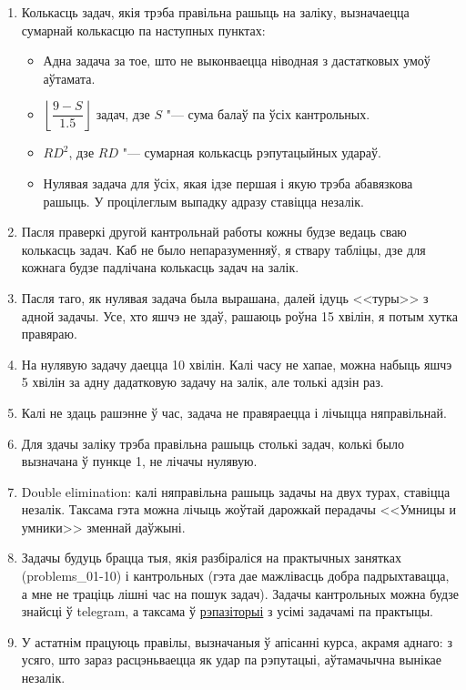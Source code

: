 \documentclass[12pt, a4paper]{extarticle}
\begin{document}
    \begin{enumerate}
        \item Колькасць задач, якія трэба правільна рашыць на заліку, вызначаецца сумарнай колькасцю па наступных пунктах:
        \begin{itemize}
            \item Адна задача за тое, што не выконваецца ніводная з дастатковых умоў аўтамата.
            \item $\left\lfloor \dfrac{9 - S}{1.5} \right\rfloor$ задач, дзе $S$ "--- сума балаў па ўсіх кантрольных.
            \item $RD^2$, дзе $RD$ "--- сумарная колькасць рэпутацыйных удараў.
            \item Нулявая задача для ўсіх, якая ідзе першая і якую трэба абавязкова рашыць. У процілеглым выпадку адразу ставіцца незалік.
        \end{itemize}
        \item Пасля праверкі другой кантрольнай работы кожны будзе ведаць сваю колькасць задач. Каб не было непаразуменняў, я ствару табліцы, дзе для кожнага будзе падлічана колькасць задач на залік.
        \item Пасля таго, як нулявая задача была вырашана, далей ідуць <<туры>> з адной задачы. Усе, хто яшчэ не здаў, рашаюць роўна 15 хвілін, я потым хутка правяраю. 
        \item На нулявую задачу даецца 10 хвілін. Калі часу не хапае, можна набыць яшчэ 5 хвілін за адну дадатковую задачу на залік, але толькі адзін раз.
        \item Калі не здаць рашэнне ў час, задача не правяраецца і лічыцца няправільнай. 
        \item Для здачы заліку трэба правільна рашыць столькі задач, колькі было вызначана ў пункце 1, не лічачы нулявую.
        \item Double elimination: калі няправільна рашыць задачы на двух турах, ставіцца незалік. Таксама гэта можна лічыць жоўтай дарожкай перадачы <<Умницы и умники>> зменнай даўжыні.
        \item Задачы будуць брацца тыя, якія разбіраліся на практычных занятках (problems\_01-10) і кантрольных (гэта дае мажлівасць добра падрыхтавацца, а мне не траціць лішні час на пошук задач). Задачы кантрольных можна будзе знайсці ў telegram, а таксама ў \href{https://github.com/bsu-docs/discrete-mathematics-problems}{рэпазіторыі} з усімі задачамі па практыцы.
        \item У астатнім працуюць правілы, вызначаныя ў апісанні курса, акрамя аднаго: з усяго, што зараз расцэньваецца як удар па рэпутацыі, аўтамачычна вынікае незалік.
    \end{enumerate}
\end{document}
